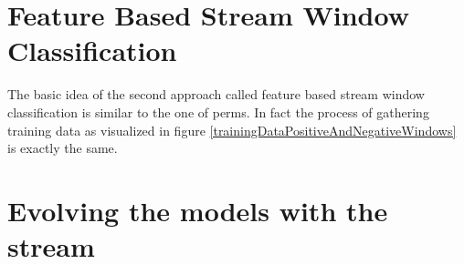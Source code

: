 \section{Feature Based Stream Window Classification}
\label{sec_FeatureBasedStreamWindowClassification}

The basic idea of the second approach called feature based stream window classification is similar to the one of perms. In fact the process of gathering training data as visualized in figure \ref{trainingDataPositiveAndNegativeWindows} is exactly the same. 


\section{Evolving the models with the stream}